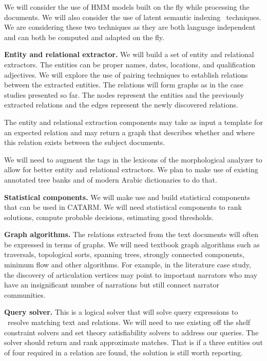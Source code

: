 \documentclass[12pt]{article}
\begin{document}
We will consider the use of HMM models 
built on the fly while processing the documents.
We will also consider the use of
latent semantic indexing~\cite{LSI89} techniques. 
We are considering these two techniques as they are 
both language independent and can both be computed and
adapted on the fly.

{\bf Entity and relational extractor.}
We will build a set of entity and relational extractors. 
The entities can be proper names, dates, locations,
and qualification adjectives. 
We will explore the use of pairing techniques to establish 
relations between the extracted entities.
The relations will form graphs as in the case studies presented
so far. The nodes represent the entities and the previously 
extracted relations and the edges represent the newly discovered 
relations.

The entity and relational extraction components 
may take as input a template for an expected relation and 
may return a graph that describes whether and where 
this relation exists between the subject documents.

We will need to augment the tags in the lexicons of the 
morphological analyzer to allow for better entity and relational
extractors. 
We plan to make use of existing annotated tree banks and of
modern Arabic dictionaries to do that. 

{\bf Statistical components.}
We will make use and build statistical components that can be used
in CATARM. 
We will need statistical components to rank solutions, compute 
probable decisions, estimating good thresholds. 

{\bf Graph algorithms.}
The relations extracted from the text documents will often 
be expressed in terms of graphs.
We will need textbook graph algorithms such as traversals, 
topological sorts, spanning trees, strongly connected 
components, minimum flow  and other algorithms.
For example, in the literature case study, the discovery
of articulation vertices may point to important narrators 
who may have an insignificant number of narrations 
but still connect narrator communities.

{\bf Query solver.}
This is a logical solver that will solve query expressions to \
resolve matching text and relations.
We will need to use existing off the shelf constraint solvers 
and set theory satisfiability solvers to address our queries. 
The solver should return and rank approximate matches.
That is if a three entities out of four required in a relation are
found, the solution is still worth reporting. 
\end{document}
